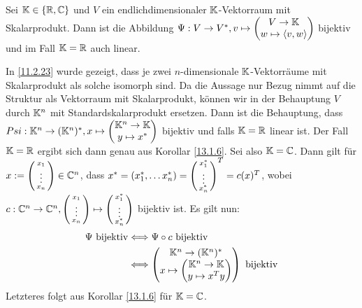 \documentclass[../../main.tex]{subfiles}
\begin{document}
\begin{kor}\label{13.1.7}
Sei $\mathbb K\in \{\mathbb R, \mathbb C\}$ und $V$ ein endlichdimensionaler $\mathbb K$-Vektorraum mit Skalarprodukt. Dann ist die Abbildung $\Psi: V\to V^*, v\mapsto\begin{pmatrix*}V\to \K \\w\mapsto \scal{v,w}\end{pmatrix*}$  bijektiv und im Fall $\mathbb K=\mathbb R$ auch linear.
\end{kor}
\begin{cproof}
In \ref{11.2.23} wurde gezeigt, dass je zwei $n$-dimensionale $\mathbb K$-Vektorräume mit Skalarprodukt als solche isomorph sind. Da die Aussage nur Bezug nimmt auf die Struktur als Vektorraum mit Skalarprodukt, können wir in der Behauptung $V$ durch $\mathbb K^n$ mit Standardskalarprodukt ersetzen. Dann ist die Behauptung, dass $Psi: \K^n\to (\K^n)^*, x\mapsto\begin{pmatrix*}\K^n\to \K \\y\mapsto x^*\end{pmatrix*}$ bijektiv und falls $\mathbb K=\mathbb R$ linear ist. Der Fall $\mathbb K=\mathbb R$ ergibt sich dann genau aus Korollar \ref{13.1.6}. Sei also $\mathbb K=\mathbb C$. Dann gilt für $x:=\left(\begin{smallmatrix}x_1\\\vdots\\x_n\end{smallmatrix}\right)\in \mathbb C^n$, dass    
$x^*=(x_1^*,\ldots x_n^*)=\left(\begin{smallmatrix}x_1^*\\\vdots\\x_n^*\end{smallmatrix}\right)^T=c(x)^T$, wobei $c: \mathbb C^n\to \mathbb C^n,\left(\begin{smallmatrix}x_1\\\vdots\\x_n\end{smallmatrix}\right)\mapsto \left(\begin{smallmatrix}x_1^*\\\vdots\\x_n^*\end{smallmatrix}\right)$ bijektiv ist. Es gilt nun:
\begin{align*}
\Psi\text{ bijektiv}&\Longleftrightarrow \Psi\circ c\text{ bijektiv}\\
&\Longleftrightarrow\begin{pmatrix*}\K^n\to (\K^n)^*\\ x\mapsto \begin{pmatrix*}\K^n\to \K\\ y\mapsto x^Ty
\end{pmatrix*}\end{pmatrix*}\text{ bijektiv}
\end{align*}
Letzteres folgt aus Korollar \ref{13.1.6} für $\mathbb K=\mathbb C$.
\end{cproof}
\end{document}
